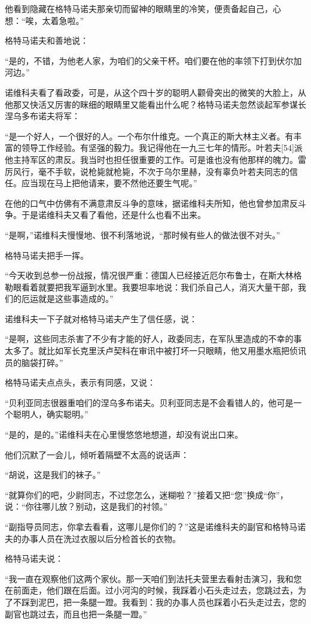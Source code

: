 他看到隐藏在格特马诺夫那亲切而留神的眼睛里的冷笑，便责备起自己，心想：“唉，太着急啦。”

格特马诺夫和善地说：

“是的，不错，为他老人家，为咱们的父亲干杯。咱们要在他的率领下打到伏尔加河边。”

诺维科夫看了看政委，可是，从这个四十岁的聪明人颧骨突出的微笑的大脸上，从他那又快活又厉害的眯细的眼睛里又能看出什么呢？格特马诺夫忽然谈起军参谋长涅乌多布诺夫将军：

“是一个好人，一个很好的人。一个布尔什维克。一个真正的斯大林主义者。有丰富的领导工作经验。有坚强的毅力。我记得他在一九三七年的情形。叶若夫[54]派他主持军区的肃反。我当时也担任很重要的工作。可是谁也没有他那样的魄力。雷厉风行，毫不手软，说枪毙就枪毙，不次于乌尔里赫，没有辜负叶若夫同志的信任。应当现在马上把他请来，要不然他还要生气呢。”

在他的口气中仿佛有不满意肃反斗争的意味，据诺维科夫所知，他也曾参加肃反斗争。于是诺维科夫又看了看他，还是什么也看不出来。

“是啊，”诺维科夫慢慢地、很不利落地说，“那时候有些人的做法很不对头。”

格特马诺夫把手一挥。

“今天收到总参一份战报，情况很严重：德国人已经接近厄尔布鲁士，在斯大林格勒眼看着就要把我军逼到水里。我要坦率地说：我们杀自己人，消灭大量干部，我们的厄运就是这些事造成的。”

诺维科夫一下子就对格特马诺夫产生了信任感，说：

“是啊，这些同志杀害了不少有才能的好人，政委同志，在军队里造成的不幸的事太多了。就比如军长克里沃卢契科在审讯中被打坏一只眼睛，他又用墨水瓶把侦讯员的脑袋打碎。”

格特马诺夫点点头，表示有同感，又说：

“贝利亚同志很器重咱们的涅乌多布诺夫。贝利亚同志是不会看错人的，他可是一个聪明人，确实聪明。”

“是的，是的。”诺维科夫在心里慢悠悠地想道，却没有说出口来。

他们沉默了一会儿，倾听着隔壁不太高的说话声：

“胡说，这是我们的袜子。”

“就算你们的吧，少尉同志，不过您怎么，迷糊啦？”接着又把“您”换成“你”，说：“你往哪儿放？别动，这是我们的衬领。”

“副指导员同志，你拿去看看，这哪儿是你们的？”这是诺维科夫的副官和格特马诺夫的办事人员在洗过衣服以后分检首长的衣物。

格特马诺夫说：

“我一直在观察他们这两个家伙。那一天咱们到法托夫营里去看射击演习，我和您在前面走，他们跟在后面。过小河沟的时候，我踩着小石头走过去，您跳过去，为了不踩到泥巴，把一条腿一蹬。我看到：我的办事人员也踩着小石头走过去，您的副官也跳过去，而且也把一条腿一蹬。”

